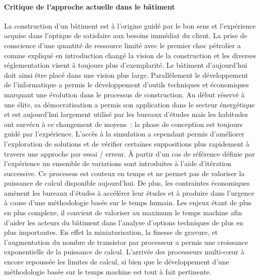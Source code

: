 \paragraph{Critique de l’approche actuelle dans le bâtiment} %
\label{par:critique_de_l_approche_actuelle_dans_le_batiment}
La construction d’un bâtiment est à l’origine guidé par le bon sens et l’expérience
acquise dans l’optique de satisfaire aux besoins immédiat du client. La prise
de conscience d’une quantité de ressource limité avec le premier choc pétrolier
a comme expliqué en introduction changé la vision de la construction et les diverses
réglementation visent à toujours plus d’exemplarité. Le bâtiment d’aujourd’hui doit
ainsi être placé dans une vision plus large.
Parallèlement le développement de l’informatique a permis le développement d’outils
techniques et économiques marquant une évolution dans le processus de construction.
Au début réservé à une élite, sa démocratisation a permis son application dans le secteur
énergétique et est aujourd’hui largement utilisé par les bureaux d’études mais
les habitudes ont survécu à ce changement de moyens~: la phase de conception est toujours
guidé par l’expérience. L’accès à la simulation a cependant permis d’améliorer
l’exploration de solutions et de vérifier certaines suppositions plus rapidement
à travers une approche par essai / erreur. À partir d’un cas de référence définie
par l’expérience un ensemble de variations sont introduites à l’aide d’itération
successive. Ce processus est couteux en temps et ne permet pas de valoriser la puissance
de calcul disponible aujourd’hui. De plus, les contraintes économiques amènent les bureaux
d’études à accélérer leur études et à produire dans l’urgence à cause d’une méthodologie
basée sur le temps humain.
Les enjeux étant de plus en plus complexe, il convient de valoriser au maximum le
temps machine afin d’aider les acteurs du bâtiment dans l’analyse d’options techniques
de plus en plus importantes.
En effet la miniaturisation, la finesse de gravure,
et l’augmentation du nombre de transistor par processeur a permis une croissance
exponentielle de la puissance de calcul. L’arrivée des processeurs multi-cœur à encore
repoussée les limites de calcul, si bien que le développement d’une méthodologie basée
sur le temps machine est tout à fait pertinente.

